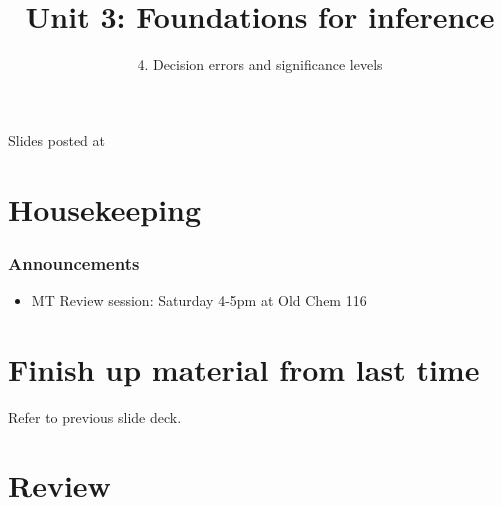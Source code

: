 \documentclass[slidestop,compress,mathserif,12pt,t,professionalfonts,xcolor=table]{beamer}
\title{Unit 3: Foundations for inference}
\subtitle{4. Decision errors and significance levels}
\author{\CourseName}
\date{}
\institute{\InstituteName}
\begin{document}



\begin{frame}[plain]

\titlepage

\vfill

{\scriptsize {} \hfill Slides posted at  \webURL{\CourseSite}}

\addtocounter{framenumber}{-1} 

\end{frame}


\section{Housekeeping}


\begin{frame}
\frametitle{Announcements}

\begin{itemize}

\item MT Review session: Saturday 4-5pm at Old Chem 116

\end{itemize}

\end{frame}


\section{Finish up material from last time}


\begin{frame}

\vfill

Refer to previous slide deck.

\vfill

\end{frame}


\section{Review}
\end{document}
